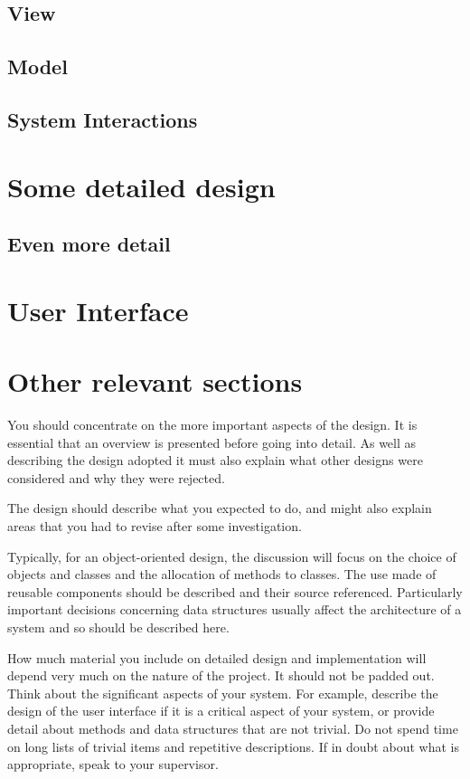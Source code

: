 \subsection{View}

\subsection{Model}

\subsection{System Interactions}


\section{Some detailed design}

\subsection{Even more detail}

\section{User Interface}

\section{Other relevant sections}

You should concentrate on the more important aspects of the design. It is essential that an overview is presented before going into detail. As well as describing the design adopted it must also explain what other designs were considered and why they were rejected.

The design should describe what you expected to do, and might also explain areas that you had to revise after some investigation.

Typically, for an object-oriented design, the discussion will focus on the choice of objects and classes and the allocation of methods to classes. The use made of reusable components should be described and their source referenced. Particularly important decisions concerning data structures usually affect the architecture of a system and so should be described here.

How much material you include on detailed design and implementation will depend very much on the nature of the project. It should not be padded out. Think about the significant aspects of your system. For example, describe the design of the user interface if it is a critical aspect of your system, or provide detail about methods and data structures that are not trivial. Do not spend time on long lists of trivial items and repetitive descriptions. If in doubt about what is appropriate, speak to your supervisor.
 
